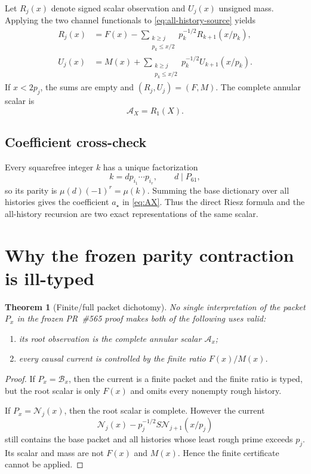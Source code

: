 \documentclass[11pt]{article}
\newtheorem{theorem}{Theorem}[section]
\newcommand{\Psmall}{P_{61}}
\newcommand{\Ann}{\mathcal A}
\newcommand{\Source}{\mathcal N}
\newcommand{\Base}{\mathcal B}
\begin{document}
Let $R_j(x)$ denote signed scalar observation and $U_j(x)$ unsigned mass.  Applying the two channel functionals to \eqref{eq:all-history-source} yields
\begin{align}
 R_j(x)&=F(x)-
 \sum_{\substack{k\ge j\\p_k\le x/2}}
 p_k^{-1/2}R_{k+1}(x/p_k),\label{eq:Rrec}\\
 U_j(x)&=M(x)+
 \sum_{\substack{k\ge j\\p_k\le x/2}}
 p_k^{-1/2}U_{k+1}(x/p_k).\label{eq:Urec}
\end{align}
If $x<2p_j$, the sums are empty and $(R_j,U_j)=(F,M)$.  The complete annular scalar is
\[
 \Ann_X=R_1(X).
\]

\subsection{Coefficient cross-check}
Every squarefree integer $k$ has a unique factorization
\[
 k=d p_{i_1}\cdots p_{i_r},
 \qquad d\mid\Psmall,
\]
so its parity is $\mu(d)(-1)^r=\mu(k)$.  Summing the base dictionary over all histories gives the coefficient $a_\star$ in \eqref{eq:AX}.  Thus the direct Riesz formula and the all-history recursion are two exact representations of the same scalar.

\section{Why the frozen parity contraction is ill-typed}

\begin{theorem}[Finite/full packet dichotomy]\label{thm:type-no-go}
No single interpretation of the packet $P_x$ in the frozen PR~\#565 proof makes both of the following uses valid:
\begin{enumerate}
\item its root observation is the complete annular scalar $\Ann_x$;
\item every causal current is controlled by the finite ratio $F(x)/M(x)$.
\end{enumerate}
\end{theorem}

\begin{proof}
If $P_x=\Base_x$, then the current is a finite packet and the finite ratio is typed, but the root scalar is only $F(x)$ and omits every nonempty rough history.

If $P_x=\Source_j(x)$, then the root scalar is complete.  However the current
\[
 \Source_j(x)-p_j^{-1/2}S\Source_{j+1}(x/p_j)
\]
still contains the base packet and all histories whose least rough prime exceeds $p_j$.  Its scalar and mass are not $F(x)$ and $M(x)$.  Hence the finite certificate cannot be applied.
\end{proof}
\end{document}
